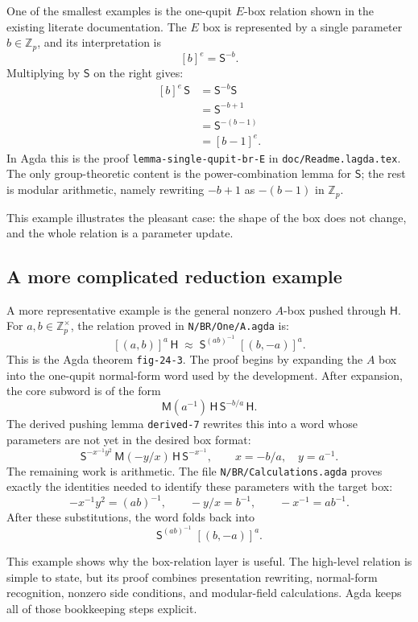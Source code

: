 \documentclass[a4paper,11pt]{article}
\newcommand{\Zp}{\mathbb Z_p}
\newcommand{\sGate}{\mathsf S}
\newcommand{\hGate}{\mathsf H}
\newcommand{\mGate}{\mathsf M}
\newcommand{\code}[1]{\texttt{#1}}
\begin{document}
One of the smallest examples is the one-qupit $E$-box relation shown
in the existing literate documentation.  The $E$ box is represented by
a single parameter $b\in\Zp$, and its interpretation is
\[
  [b]^e = \sGate^{-b}.
\]
Multiplying by $\sGate$ on the right gives:
\[
\begin{aligned}
  [b]^e\,\sGate
    &= \sGate^{-b}\sGate \\
    &= \sGate^{-b+1} \\
    &= \sGate^{-(b-1)} \\
    &= [b-1]^e .
\end{aligned}
\]
In Agda this is the proof
\code{lemma-single-qupit-br-E} in \code{doc/Readme.lagda.tex}.  The
only group-theoretic content is the power-combination lemma for
$\sGate$; the rest is modular arithmetic, namely rewriting
$-b+1$ as $-(b-1)$ in $\Zp$.

This example illustrates the pleasant case: the shape of the box does
not change, and the whole relation is a parameter update.

\subsection{A more complicated reduction example}

A more representative example is the general nonzero $A$-box pushed
through $\hGate$.  For $a,b\in\Zp^\times$, the relation proved in
\code{N/BR/One/A.agda} is:
\[
  [(a,b)]^a\,\hGate
  \;\approx\;
  \sGate^{(ab)^{-1}}\;[(b,-a)]^a .
\]
This is the Agda theorem \code{fig-24-3}.  The proof begins by
expanding the $A$ box into the one-qupit normal-form word used by the
development.  After expansion, the core subword is of the form
\[
  \mGate(a^{-1})\,\hGate\,\sGate^{-b/a}\,\hGate .
\]
The derived pushing lemma \code{derived-7} rewrites this into a word
whose parameters are not yet in the desired box format:
\[
  \sGate^{-x^{-1}y^2}\,
  \mGate(-y/x)\,
  \hGate\,\sGate^{-x^{-1}},
  \qquad
  x=-b/a,\quad y=a^{-1}.
\]
The remaining work is arithmetic.  The file
\code{N/BR/Calculations.agda} proves exactly the identities needed to
identify these parameters with the target box:
\[
  -x^{-1}y^2 = (ab)^{-1},\qquad
  -y/x = b^{-1},\qquad
  -x^{-1} = a b^{-1}.
\]
After these substitutions, the word folds back into
\[
  \sGate^{(ab)^{-1}}\;[(b,-a)]^a .
\]

This example shows why the box-relation layer is useful.  The
high-level relation is simple to state, but its proof combines
presentation rewriting, normal-form recognition, nonzero side
conditions, and modular-field calculations.  Agda keeps all of those
bookkeeping steps explicit.
\end{document}
